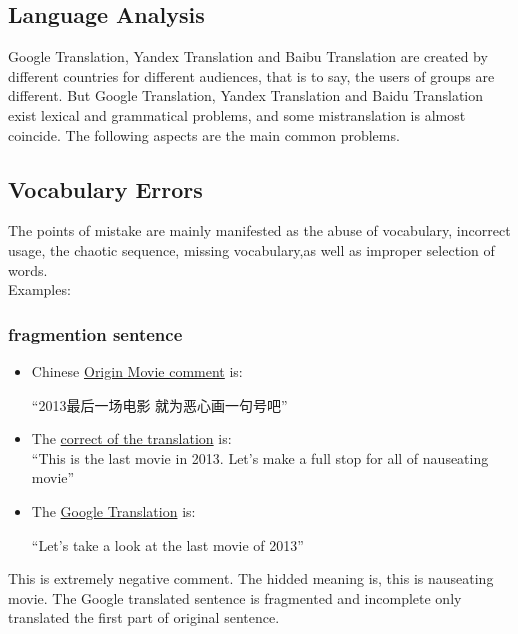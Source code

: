 \documentclass[conference]{IEEEtran}
\begin{document}
\begin{CJK*}{UTF8}{gbsn}
\section{Language Analysis}
Google Translation, Yandex Translation and Baibu Translation are created by
different countries for different audiences, that is to say, the users of groups
are different. But Google Translation, Yandex Translation and Baidu Translation
exist lexical and grammatical problems, and some mistranslation is almost
coincide. The following aspects are the main common problems.
\subsection{Vocabulary Errors}
 The points of mistake are mainly manifested as the abuse of vocabulary,
 incorrect usage, the chaotic sequence, missing vocabulary,as well as improper
 selection of words.\\
 Examples:
 \subsubsection{fragmention sentence}
\begin{itemize}
\item Chinese \underline{Origin Movie comment} is:
  \begin{center}
    ``2013最后一场电影 就为恶心画一句号吧''
  \end{center}
\item The \underline{correct of the translation} is:\\
    ``This is the last movie in 2013. Let's make a full stop for all of nauseating  movie''
\item The \underline{Google Translation} is:
  \begin{center}
    ``Let's take a look at the last movie of 2013''
  \end{center}
\end{itemize}
  This is extremely negative comment. The hidded meaning is, this is nauseating
  movie. The Google translated sentence is fragmented and incomplete only
  translated the first part of original sentence.


\end{CJK*}
\end{document}
